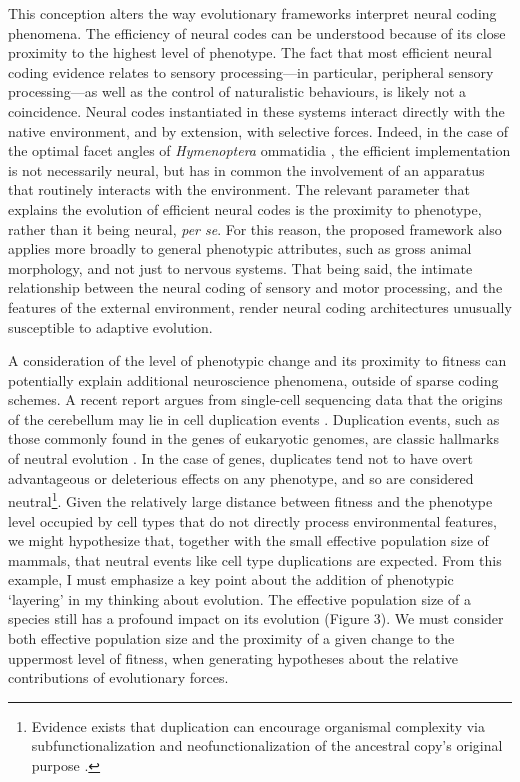 \documentclass{article}
\begin{document}
This conception alters the way evolutionary frameworks interpret neural coding phenomena. The efficiency of neural codes can be understood because of its close proximity to the highest level of phenotype. The fact that most efficient neural coding evidence relates to sensory processing---in particular, peripheral sensory processing---as well as the control of naturalistic behaviours, is likely not a coincidence. Neural codes instantiated in these systems interact directly with the native environment, and by extension, with selective forces. Indeed, in the case of the optimal facet angles of \textit{Hymenoptera} ommatidia \cite{barlow_1952}, the efficient implementation is not necessarily neural, but has in common the involvement of an apparatus that routinely interacts with the environment. The relevant parameter that explains the evolution of efficient neural codes is the proximity to phenotype, rather than it being neural, \textit{per se}. For this reason, the proposed framework also applies more broadly to general phenotypic attributes, such as gross animal morphology, and not just to nervous systems. That being said, the intimate relationship between the neural coding of sensory and motor processing, and the features of the external environment, render neural coding architectures unusually susceptible to adaptive evolution.

A consideration of the level of phenotypic change and its proximity to fitness can potentially explain additional neuroscience phenomena, outside of sparse coding schemes. A recent report argues from single-cell sequencing data that the origins of the cerebellum may lie in cell duplication events \cite{kebschull_luo_2020}. Duplication events, such as those commonly found in the genes of eukaryotic genomes, are classic hallmarks of neutral evolution \cite{Stoltzfus_1999, Lynch_2007, lynch2007origins, wideman_doolittle_2019}. In the case of genes, duplicates tend not to have overt advantageous or deleterious effects on any phenotype, and so are considered neutral\footnote{Evidence exists that duplication can encourage organismal complexity via subfunctionalization and neofunctionalization of the ancestral copy's original purpose \cite{dean_thornton_2007, Lynch_2007}.}. Given the relatively large distance between fitness and the phenotype level occupied by cell types that do not directly process environmental features, we might hypothesize that, together with the small effective population size of mammals, that neutral events like cell type duplications are expected. From this example, I must emphasize a key point about the addition of phenotypic `layering' in my thinking about evolution. The effective population size of a species still has a profound impact on its evolution (Figure 3). We must consider both effective population size and the proximity of a given change to the uppermost level of fitness, when generating hypotheses about the relative contributions of evolutionary forces. 
\end{document}
